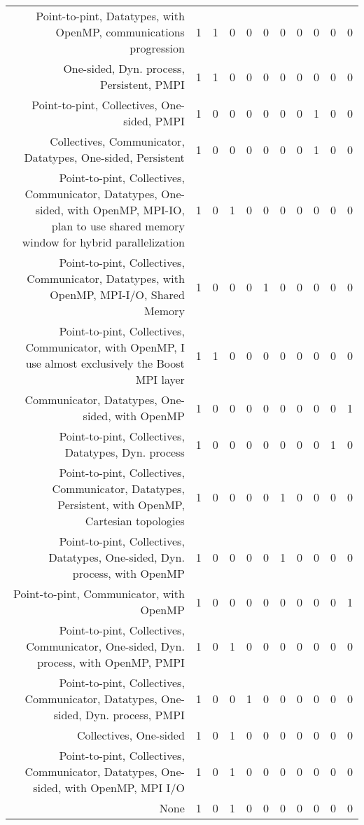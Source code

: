 {\begin{landscape}
\begin{longtable}[htb]{r|c|c|c|c|c|c|c|c|c|c}
{Point-to-pint, Datatypes, with OpenMP, communications progression} & 1 & 1 & 0 & 0 & 0 & 0 & 0 & 0 & 0 & 0 \\%
{One-sided, Dyn. process, Persistent, PMPI} & 1 & 1 & 0 & 0 & 0 & 0 & 0 & 0 & 0 & 0 \\%
{Point-to-pint, Collectives, One-sided, PMPI} & 1 & 0 & 0 & 0 & 0 & 0 & 0 & 1 & 0 & 0 \\%
{Collectives, Communicator, Datatypes, One-sided, Persistent} & 1 & 0 & 0 & 0 & 0 & 0 & 0 & 1 & 0 & 0 \\%
{Point-to-pint, Collectives, Communicator, Datatypes, One-sided, with OpenMP, MPI-IO, plan to use shared memory window for hybrid parallelization} & 1 & 0 & 1 & 0 & 0 & 0 & 0 & 0 & 0 & 0 \\%
{Point-to-pint, Collectives, Communicator, Datatypes, with OpenMP, MPI-I/O, Shared Memory} & 1 & 0 & 0 & 0 & 1 & 0 & 0 & 0 & 0 & 0 \\%
{Point-to-pint, Collectives, Communicator, with OpenMP, I use almost exclusively the Boost MPI layer} & 1 & 1 & 0 & 0 & 0 & 0 & 0 & 0 & 0 & 0 \\%
{Communicator, Datatypes, One-sided, with OpenMP} & 1 & 0 & 0 & 0 & 0 & 0 & 0 & 0 & 0 & 1 \\%
{Point-to-pint, Collectives, Datatypes, Dyn. process} & 1 & 0 & 0 & 0 & 0 & 0 & 0 & 0 & 1 & 0 \\%
{Point-to-pint, Collectives, Communicator, Datatypes, Persistent, with OpenMP, Cartesian topologies} & 1 & 0 & 0 & 0 & 0 & 1 & 0 & 0 & 0 & 0 \\%
{Point-to-pint, Collectives, Datatypes, One-sided, Dyn. process, with OpenMP} & 1 & 0 & 0 & 0 & 0 & 1 & 0 & 0 & 0 & 0 \\%
{Point-to-pint, Communicator, with OpenMP} & 1 & 0 & 0 & 0 & 0 & 0 & 0 & 0 & 0 & 1 \\%
{Point-to-pint, Collectives, Communicator, One-sided, Dyn. process, with OpenMP, PMPI} & 1 & 0 & 1 & 0 & 0 & 0 & 0 & 0 & 0 & 0 \\%
{Point-to-pint, Collectives, Communicator, Datatypes, One-sided, Dyn. process, PMPI} & 1 & 0 & 0 & 1 & 0 & 0 & 0 & 0 & 0 & 0 \\%
{Collectives, One-sided} & 1 & 0 & 1 & 0 & 0 & 0 & 0 & 0 & 0 & 0 \\%
{Point-to-pint, Collectives, Communicator, Datatypes, One-sided, with OpenMP, MPI I/O} & 1 & 0 & 1 & 0 & 0 & 0 & 0 & 0 & 0 & 0 \\%
{None} & 1 & 0 & 1 & 0 & 0 & 0 & 0 & 0 & 0 & 0 \\%

\end{longtable}
\end{landscape}}
